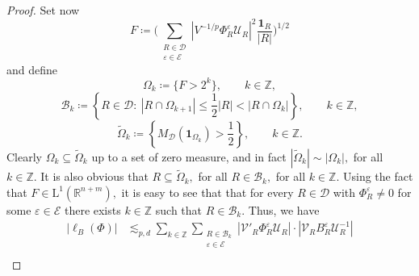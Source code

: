\documentclass{article}
\theoremstyle{definition}
\theoremstyle{remark}
\numberwithin{equation}{section}
\newcommand{\cB}{\mathcal{B}}
\newcommand{\cE}{\mathcal{E}}
\newcommand{\cU}{\mathcal{U}}
\newcommand{\cV}{\mathcal{V}}
\newcommand{\bfD}{\bm{\mathcal{D}}}
\newcommand{\e}{\varepsilon}
\newcommand{\integer}{\mathbb{Z}}
\newcommand{\reals}{\mathbb{R}}
\newcommand{\Lp}[1]{\mathrm{L}^{#1}}
\newcommand{\1}{\mathbf{1}}
\begin{document}
\begin{proof}
        Set now
        \begin{equation*}
            F\coloneq \bigg(\sum_{\substack{R\in\bfD\\\e\in\cE}}|V^{-1/p}\Phi_{R}^{\e}\cU_{R}|^2\frac{\1_{R}}{|R|}\bigg)^{1/2}
        \end{equation*}
        and define
        \begin{equation*}
            \Omega_k\coloneq \{ F>2^k\},\qquad k\in\integer,
        \end{equation*}
        \begin{equation*}
            \cB_k\coloneq \left\{ R\in\bfD:~|R\cap\Omega_{k+1}|\leq\frac{1}{2}|R|<|R\cap\Omega_{k}|\right\},\qquad k\in\integer,
        \end{equation*}
        \begin{equation*}
            \widetilde{\Omega}_k\coloneq \left\{ M_{\bfD}(\1_{\Omega_k})>\frac{1}{2}\right\},\qquad k\in\integer.
        \end{equation*}
        Clearly $\Omega_k\subseteq\widetilde{\Omega}_k$ up to a set of zero measure, and in fact $|\widetilde{\Omega}_k|\sim|\Omega_k|,$ for all $k\in\integer.$ It is also obvious that $R\subseteq\widetilde{\Omega}_k,$ for all $R\in\cB_k,$ for all $k\in\integer.$        
        Using the fact that $F\in\Lp{1}(\reals^{n+m}),$ it is easy to see that that for every $R\in\bfD$ with $\Phi_{R}^{\e}\neq0$ for some $\e\in\cE$ there exists $k\in\integer$ such that $R\in\cB_k.$ Thus, we have
        \begin{align*}
            |\ell_{B}(\Phi)|
            &\lesssim_{p,d} \sum_{k\in\integer}\sum_{\substack{R\in\cB_k\\\e\in\cE}}|\cV'_{R}\Phi_{R}^{\e}\cU_{R}|\cdot|\cV_{R}B_{R}^{\e}\cU_{R}^{-1}|\\

\end{align*}
\end{proof}
\end{document}
